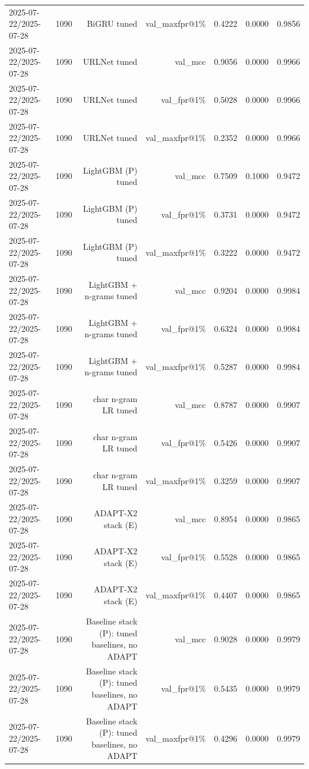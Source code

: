 \begin{table}[t]
\begin{tabular}{llrrrrr}
2025-07-22/2025-07-28 & 1090 & BiGRU tuned & val\_maxfpr@1\% & 0.4222 & 0.0000 & 0.9856 \\
2025-07-22/2025-07-28 & 1090 & URLNet tuned & val\_mcc & 0.9056 & 0.0000 & 0.9966 \\
2025-07-22/2025-07-28 & 1090 & URLNet tuned & val\_fpr@1\% & 0.5028 & 0.0000 & 0.9966 \\
2025-07-22/2025-07-28 & 1090 & URLNet tuned & val\_maxfpr@1\% & 0.2352 & 0.0000 & 0.9966 \\
2025-07-22/2025-07-28 & 1090 & LightGBM (P) tuned & val\_mcc & 0.7509 & 0.1000 & 0.9472 \\
2025-07-22/2025-07-28 & 1090 & LightGBM (P) tuned & val\_fpr@1\% & 0.3731 & 0.0000 & 0.9472 \\
2025-07-22/2025-07-28 & 1090 & LightGBM (P) tuned & val\_maxfpr@1\% & 0.3222 & 0.0000 & 0.9472 \\
2025-07-22/2025-07-28 & 1090 & LightGBM + n-grams tuned & val\_mcc & 0.9204 & 0.0000 & 0.9984 \\
2025-07-22/2025-07-28 & 1090 & LightGBM + n-grams tuned & val\_fpr@1\% & 0.6324 & 0.0000 & 0.9984 \\
2025-07-22/2025-07-28 & 1090 & LightGBM + n-grams tuned & val\_maxfpr@1\% & 0.5287 & 0.0000 & 0.9984 \\
2025-07-22/2025-07-28 & 1090 & char n-gram LR tuned & val\_mcc & 0.8787 & 0.0000 & 0.9907 \\
2025-07-22/2025-07-28 & 1090 & char n-gram LR tuned & val\_fpr@1\% & 0.5426 & 0.0000 & 0.9907 \\
2025-07-22/2025-07-28 & 1090 & char n-gram LR tuned & val\_maxfpr@1\% & 0.3259 & 0.0000 & 0.9907 \\
2025-07-22/2025-07-28 & 1090 & ADAPT-X2 stack (E) & val\_mcc & 0.8954 & 0.0000 & 0.9865 \\
2025-07-22/2025-07-28 & 1090 & ADAPT-X2 stack (E) & val\_fpr@1\% & 0.5528 & 0.0000 & 0.9865 \\
2025-07-22/2025-07-28 & 1090 & ADAPT-X2 stack (E) & val\_maxfpr@1\% & 0.4407 & 0.0000 & 0.9865 \\
2025-07-22/2025-07-28 & 1090 & Baseline stack (P): tuned baselines, no ADAPT & val\_mcc & 0.9028 & 0.0000 & 0.9979 \\
2025-07-22/2025-07-28 & 1090 & Baseline stack (P): tuned baselines, no ADAPT & val\_fpr@1\% & 0.5435 & 0.0000 & 0.9979 \\
2025-07-22/2025-07-28 & 1090 & Baseline stack (P): tuned baselines, no ADAPT & val\_maxfpr@1\% & 0.4296 & 0.0000 & 0.9979 \\

\end{tabular}
\end{table}
